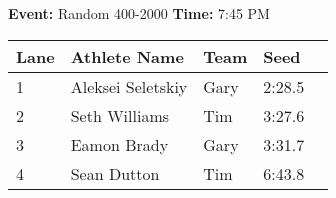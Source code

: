 \documentclass[10pt]{article}
\begin{document}
\textbf{Event:} Random 400-2000 \quad \textbf{Time:} 7:45 PM 

\vspace{1em}
\begin{tabular}{@{}lllll@{}}
\toprule

\textbf{Lane} & \textbf{Athlete Name} & \textbf{Team} & \textbf{Seed} \\
\midrule
1 & Aleksei Seletskiy & Gary & 2:28.5 &\\
2 & Seth Williams & Tim & 3:27.6 &\\
3 & Eamon Brady & Gary & 3:31.7 &\\
4 & Sean Dutton & Tim & 6:43.8 &\\
\bottomrule
\end{tabular}
\vspace{2.5em}
\end{document}

